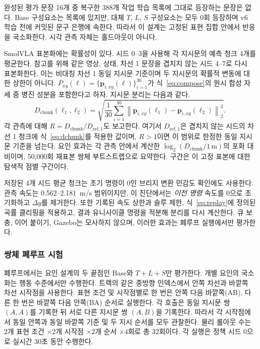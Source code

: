 \documentclass[letterpaper,conference]{IEEEtran}
\newcommand{\dchunk}{D_{\mathrm{chunk}}}
\begin{document}
완성된 평가 문장 16개 중 복구한 388개 작업 학습 목록에 그대로 등장하는 문장은 없다.
Base 구성요소는 목록에 있지만, 대체 $T$, $L$, $S$ 구성요소는 모두 0회 등장하며 v6
학습 전에 커밋된 문구 은행에 속한다. 따라서 이 설계는 고정된 표현 집합 안에서 반응을
국소화한다. 시각 관측 자체는 홀드아웃이 아니다.

SmolVLA 표본화에는 확률성이 있다. 시드 0--3을 사용해 각 지시문의 예측 청크 4개를
평균한다. 참고를 위해 같은 영상, 상태, 차선 1 문장을 겹치지 않는 시드 4--7로 다시
표본화한다. 이는 비대칭 차선 1 동일 지시문 기준이며 두 지시문의 확률적 변동에 대한
상한이 아니다. $P_{xy}(\ell)=\{\mathbf{p}_{i,xy}(\ell)\}_{i=1}^{30}$가
식~\eqref{eq:compose}의 원시 합성 자세 중 병진 성분을 포함한다고 하자. 지시문 분리는
다음과 같다.
\begin{equation}
\dchunk(\ell_1,\ell_2)=
\sqrt{\frac{1}{30}\sum_{i=1}^{30}
\left\|\mathbf{p}_{i,xy}(\ell_1)-\mathbf{p}_{i,xy}(\ell_2)\right\|_2^2}.
\label{eq:dchunk}
\end{equation}
각 관측에 대해 $R=\dchunk/D_{\mathrm{ref},1}$도 보고한다. 여기서
$D_{\mathrm{ref},1}$은 겹치지 않는 시드의 차선 1 청크에 식~\eqref{eq:dchunk}를
적용한 값이며, $R>1$이면 이 범위로 한정한 동일 지시문 기준을 넘는다. 요인 효과는 각
관측 안에서 계산한 $\log_2(\dchunk/1\,\mathrm{m})$의 포화 대비이며, 50,000회 재표본
쌍체 부트스트랩으로 요약한다. 구간은 이 고정 표본에 대한 탐색적 점별 구간이다.

저장된 4개 시드 평균 청크는 초기 명령이 0인 브리지 변환 민감도 확인에도 사용한다.
관측 속도는 0.562--2.181~m/s 범위이지만, 이 진단에서는 \emph{이전 명령} 속도를 0으로
초기화하고 $\Delta y$를 제거한다. 또한 기록된 속도 상한과 슬루 제한, 식~\eqref{eq:replay}에
정의된 곡률 클리핑을 적용하고, 결과 유니사이클 명령을 적분해 분리를 다시 계산한다.
큐 보충, 이어 붙이기, Gazebo는 모사하지 않으며, 이러한 효과는 폐루프 실행에서만 평가한다.

\subsubsection{쌍체 폐루프 시험}
폐루프에서는 요인 설계의 두 끝점인 Base와 $T{+}L{+}S$만 평가한다. 개별 요인의
국소화는 행동 수준에서만 수행한다. 트랙의 같은 종방향 인덱스에서 안쪽 차선과 바깥쪽
차선 시작점을 사용한다. 표현 조건 및 시작점별로 한 번은 안쪽 다음 바깥쪽(AB), 다른
한 번은 바깥쪽 다음 안쪽(BA) 순서로 실행한다. 각 호출은 동일 지시문 쌍 $(A,A)$를
기록한 뒤 서로 다른 지시문 쌍 $(A,B)$을 기록한다. 따라서 각 시작점에서 동일 안쪽과
동일 바깥쪽 기준 및 두 지시 순서를 모두 관찰한다. 물리 롤아웃 수는 $2$개 표현 조건
$\times2$개 시작점 $\times2$개 순서 $\times4$회로 총 32회이다. 각 실행은 정책 시드
0으로 실시간 30초 동안 수행한다.
\end{document}
